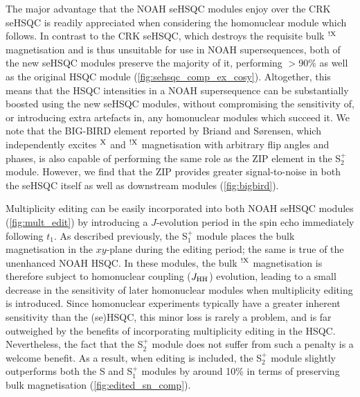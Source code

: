 \documentclass[11pt]{article}
\newcommand*{\noahS}{S}
\newcommand*{\noahSpa}{S$^+_1$}
\newcommand*{\noahSpb}{S$^+_2$}
\newcommand*{\magn}[1]{\ce{^1H}$^{#1}$}
\newcommand*{\magnnot}[1]{\ce{^1H}$^{!#1}$}
\newcommand*{\jhh}{J_{\ce{HH}}}
\begin{document}
\begin{refsection}
The major advantage that the NOAH seHSQC modules enjoy over the CRK seHSQC is readily appreciated when considering the homonuclear module which follows.
In contrast to the CRK seHSQC, which destroys the requisite bulk \magnnot{\ce{X}} magnetisation and is thus unsuitable for use in NOAH supersequences, both of the new seHSQC modules preserve the majority of it, performing $>$90\% as well as the original HSQC module (\cref{fig:sehsqc_comp_ex_cosy}).
Altogether, this means that the HSQC intensities in a NOAH supersequence can be substantially boosted using the new seHSQC modules, without compromising the sensitivity of, or introducing extra artefacts in, any homonuclear modules which succeed it.
We note that the BIG-BIRD element reported by Briand and S{\o}rensen\autocite{Briand1997JMR}, which independently excites \magn{\ce{X}} and \magnnot{\ce{X}} magnetisation with arbitrary flip angles and phases, is also capable of performing the same role as the ZIP element in the \noahSpb{} module.
However, we find that the ZIP provides greater signal-to-noise in both the seHSQC itself as well as downstream modules (\cref{fig:bigbird}).

Multiplicity editing\autocite{Parella1997JMR} can be easily incorporated into both NOAH seHSQC modules (\cref{fig:mult_edit}) by introducing a $J$-evolution period in the spin echo immediately following $t_1$.
As described previously, the \noahSpa{} module places the bulk magnetisation in the $xy$-plane during the editing period; the same is true of the unenhanced NOAH HSQC.
In these modules, the bulk \magnnot{\ce{X}} magnetisation is therefore subject to homonuclear coupling ($\jhh$) evolution, leading to a small decrease in the sensitivity of later homonuclear modules when multiplicity editing is introduced.
Since homonuclear experiments typically have a greater inherent sensitivity than the (se)HSQC, this minor loss is rarely a problem, and is far outweighed by the benefits of incorporating multiplicity editing in the HSQC.
Nevertheless, the fact that the \noahSpb{} module does not suffer from such a penalty is a welcome benefit.
As a result, when editing is included, the \noahSpb{} module slightly outperforms both the \noahS{} and \noahSpa{} modules by around 10\% in terms of preserving bulk magnetisation (\cref{fig:edited_sn_comp}).


\end{refsection}
\end{document}

